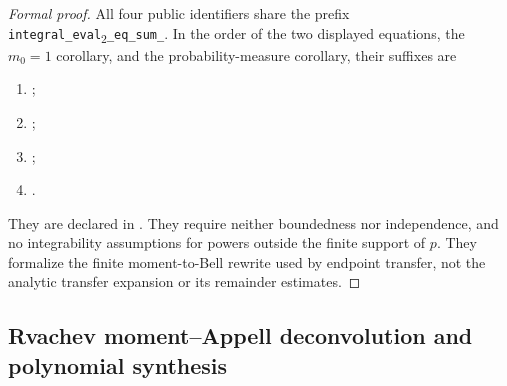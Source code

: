 \documentclass[11pt,oneside]{article}
\theoremstyle{definition}
\theoremstyle{remark}
\begin{document}
\begin{proof}[Formal proof]
All four public identifiers share the prefix
\texttt{integral\_eval}\textsubscript{2}\texttt{\_eq\_sum\_}.
In the order of the two displayed equations, the \(m_0=1\) corollary,
and the probability-measure corollary, their suffixes are
\begin{enumerate}[label=(\roman*),leftmargin=2.8em,itemsep=0pt,topsep=2pt]
 \item {};
 \item {};
 \item {};
 \item {}.
\end{enumerate}
They are declared in .
They require neither boundedness nor independence, and no integrability
assumptions for powers outside the finite support of \(p\).
They formalize the finite moment-to-Bell rewrite used by endpoint transfer,
not the analytic transfer expansion or its remainder estimates.
\end{proof}

\subsection{Rvachev moment--Appell deconvolution and polynomial synthesis}
\label{sec:rvachev-moment-appell}
\end{document}
